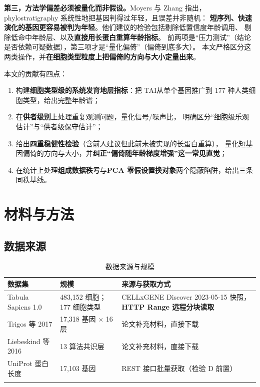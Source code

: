 \documentclass[numsec,webpdf,modern,large]{oup-authoring-template}
\newcommand{\tai}{\textrm{TAI}}
\begin{document}
\textbf{第三，方法学偏差必须被量化而非假设。}Moyers 与 Zhang\citeyearpar{moyers2015,moyers2017,moyers2018}
指出，phylostratigraphy 系统性地把基因判得过年轻，且误差并非随机：
\textbf{短序列、快速演化的基因更容易被判为年轻}。他们建议的检验包括剔除低置信度年龄调用、
剔除低命中年龄层、以及\textbf{直接用长蛋白重算年龄指标}。
前两项是“压力测试”（结论是否依赖可疑数据），第三项才是“量化偏倚”（偏倚到底多大）。
本文严格区分这两类操作，并\textbf{在细胞类型粒度上把偏倚的方向与大小定量出来}。

本文的贡献有四点：
\begin{enumerate}[label=(\arabic*)]
  \item 构建\textbf{细胞类型级的系统发育地层指标}：把 \tai 从单个基因推广到 177 种人类细胞类型，给出完整年龄谱；
  \item 在\textbf{供者级别}上处理重复观测问题，量化信号/噪声比，
        明确区分“细胞级乐观估计”与“供者级保守估计”；
  \item 给出\textbf{四重稳健性检验}（含前人建议但此前未被实现的长蛋白重算），
        量化短基因偏倚的方向与大小，并\textbf{纠正“偏倚随年龄梯度增强”这一常见直觉}；
  \item 在统计上处理\textbf{组成数据秩亏}与\textbf{PCA 零假设置换对象}两个隐蔽陷阱，给出三条同秩基线。
\end{enumerate}

\section{材料与方法}

\subsection{数据来源}

\begin{table}[H]
  \centering
  \caption{数据来源与规模}
  \label{tab:data}
  \small
  \begin{tabularx}{\textwidth}{@{}p{3.0cm}p{3.1cm}X@{}}
    \toprule
    数据集 & 规模 & 来源与获取方式 \\
    \midrule
    Tabula Sapiens 1.0 & 483,152 细胞；177 细胞类型 & CELLxGENE Discover 2023-05-15 快照，\textbf{HTTP Range 远程分块读取}\citep{conservation2020} \\
    Trigos 等 2017 & 17,318 基因 $\times$ 16 层 & 论文补充材料，直接下载\citep{trigos2017} \\
    Liebeskind 等 2016 & 13 算法共识层 & 论文补充材料，直接下载\citep{liebeskind2016} \\
    UniProt 蛋白长度 & 17,103 基因 & REST 接口批量获取（检验 D 前置） \\
    \botrule
  \end{tabularx}
\end{table}
\end{document}

